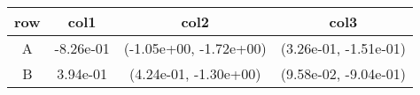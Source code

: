 \begin{tabular}{cccc}
\toprule
row&col1&col2&col3\tabularnewline
\midrule
A&-8.26e-01& (-1.05e+00, -1.72e+00)& (3.26e-01, -1.51e-01)\tabularnewline
B&3.94e-01& (4.24e-01, -1.30e+00)& (9.58e-02, -9.04e-01)\tabularnewline
\bottomrule
\end{tabular}
